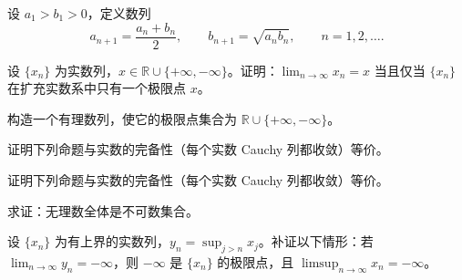 \newpage
\noindent\begin{minipage}{\textwidth}
设 $a_1>b_1>0$，定义数列\[a_{n+1}=\frac{a_n+b_n}{2},\qquad b_{n+1}=\sqrt{a_nb_n},\qquad n=1,2,\ldots.\]
\end{minipage}\par\vfill
\newpage
\noindent\begin{minipage}{\textwidth}
设 $\{x_n\}$ 为实数列，$x\in\mathbb R\cup\{+\infty,-\infty\}$。证明：$\lim_{n\to\infty}x_n=x$ 当且仅当 $\{x_n\}$ 在扩充实数系中只有一个极限点 $x$。
\end{minipage}\par\vfill
\noindent\begin{minipage}{\textwidth}
构造一个有理数列，使它的极限点集合为 $\mathbb R\cup\{+\infty,-\infty\}$。
\end{minipage}\par\vfill
\noindent\begin{minipage}{\textwidth}
证明下列命题与实数的完备性（每个实数 Cauchy 列都收敛）等价。
\end{minipage}\par\vfill
\noindent\begin{minipage}{\textwidth}
证明下列命题与实数的完备性（每个实数 Cauchy 列都收敛）等价。
\end{minipage}\par\vfill
\newpage
\noindent\begin{minipage}{\textwidth}
求证：无理数全体是不可数集合。
\end{minipage}\par\vfill
\noindent\begin{minipage}{\textwidth}
设 $\{x_n\}$ 为有上界的实数列，$y_n=\sup_{j>n}x_j$。补证以下情形：若 $\lim_{n\to\infty}y_n=-\infty$，则 $-\infty$ 是 $\{x_n\}$ 的极限点，且 $\limsup_{n\to\infty}x_n=-\infty$。
\end{minipage}\par\vfill
